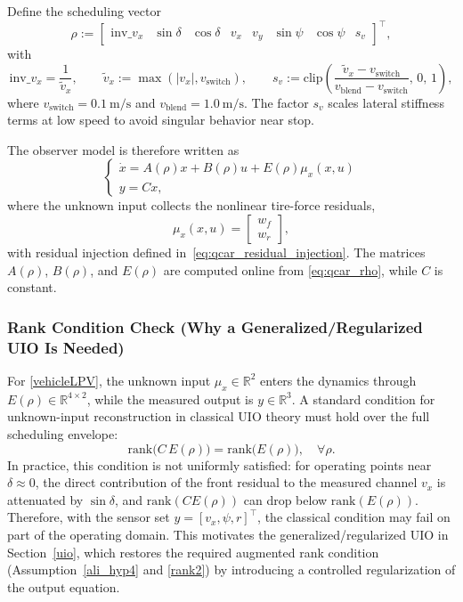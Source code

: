 Define the scheduling vector
\begin{equation}\label{eq:qcar_rho}
    \rho :=
    \begin{bmatrix}
        \mathrm{inv}\_v_x & \sin\delta & \cos\delta & v_x & v_y & \sin\psi & \cos\psi & s_v
    \end{bmatrix}^{\!\top},
\end{equation}
with
\[
\mathrm{inv}\_v_x=\frac{1}{\tilde v_x},\qquad \tilde v_x:=\max\!\left(|v_x|,v_{\mathrm{switch}}\right),\qquad
s_v:=\mathrm{clip}\!\left(\frac{\tilde v_x-v_{\mathrm{switch}}}{v_{\mathrm{blend}}-v_{\mathrm{switch}}},\,0,\,1\right),
\]
where $v_{\mathrm{switch}}=0.1~\mathrm{m/s}$ and $v_{\mathrm{blend}}=1.0~\mathrm{m/s}$. The factor $s_v$ scales lateral stiffness terms at low speed to avoid singular behavior near stop.

The observer model is therefore written as
\begin{equation}\label{vehicleLPV}
    \begin{cases}
        \dot{x} = A(\rho)x + B(\rho)u + E(\rho)\mu_x(x,u) \\
        y = Cx,
    \end{cases}
\end{equation}
where the unknown input collects the nonlinear tire-force residuals,
\begin{equation}
    \mu_x(x,u)=\begin{bmatrix} w_f \\ w_r \end{bmatrix},
\end{equation}
with residual injection defined in~\eqref{eq:qcar_residual_injection}. The matrices $A(\rho)$, $B(\rho)$, and $E(\rho)$ are computed online from \eqref{eq:qcar_rho}, while $C$ is constant.

\subsubsection{Rank Condition Check (Why a Generalized/Regularized UIO Is Needed)}
For \eqref{vehicleLPV}, the unknown input $\mu_x\in\mathbb{R}^2$ enters the dynamics through $E(\rho)\in\mathbb{R}^{4\times 2}$, while the measured output is $y\in\mathbb{R}^3$. A standard condition for unknown-input reconstruction in classical UIO theory must hold over the full scheduling envelope:
\begin{equation}\label{rank_vehicle_classical}
    \mathrm{rank}\!\big(C\,E(\rho)\big)=\mathrm{rank}\!\big(E(\rho)\big),\quad \forall \rho.
\end{equation}
In practice, this condition is not uniformly satisfied: for operating points near $\delta\approx 0$, the direct contribution of the front residual to the measured channel $v_x$ is attenuated by $\sin\delta$, and $\mathrm{rank}(C E(\rho))$ can drop below $\mathrm{rank}(E(\rho))$. Therefore, with the sensor set $y=[v_x,\psi,r]^\top$, the classical condition may fail on part of the operating domain. This motivates the generalized/regularized UIO in Section~\ref{uio}, which restores the required augmented rank condition (Assumption~\ref{ali_hyp4} and \eqref{rank2}) by introducing a controlled regularization of the output equation.


